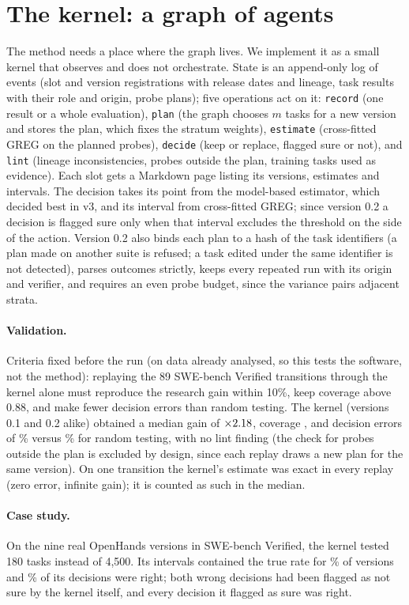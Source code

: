 \documentclass[11pt]{article}
\begin{document}
\section{The kernel: a graph of agents}
\label{sec:kernel}
The method needs a place where the graph lives. We implement it as a small kernel that observes and does not
orchestrate. State is an append-only log of events (slot and version registrations with release dates and lineage,
task results with their role and origin, probe plans); five operations act on it: \texttt{record} (one result or a
whole evaluation), \texttt{plan} (the graph chooses $m$ tasks for a new version and stores the plan, which fixes the
stratum weights), \texttt{estimate} (cross-fitted GREG on the planned probes), \texttt{decide} (keep or replace,
flagged sure or not), and \texttt{lint} (lineage inconsistencies, probes outside the plan, training tasks used as
evidence). Each slot gets a Markdown page listing its versions, estimates and intervals. The decision takes its point
from the model-based estimator, which decided best in v3, and its interval from cross-fitted GREG; since version 0.2 a
decision is flagged sure only when that interval excludes the threshold on the side of the action. Version 0.2 also
binds each plan to a hash of the task identifiers (a plan made on another suite is refused; a task edited under the
same identifier is not detected), parses outcomes strictly, keeps
every repeated run with its origin and verifier, and requires an even probe budget, since the variance pairs adjacent
strata.

\paragraph{Validation.} Criteria fixed before the run (on data already analysed, so this tests the software, not the
method): replaying the 89 SWE-bench Verified transitions through the
kernel alone must reproduce the research gain within 10\%, keep coverage above 0.88, and make fewer decision errors
than random testing. The
kernel (versions 0.1 and 0.2 alike) obtained a median gain of $\times2.18$, coverage \KernelCov, and decision errors of \KernelDec\% versus
\KernelDecReset\% for random testing, with no lint finding (the check for probes outside the plan is excluded by
design, since each replay draws a new plan for the same version). On one transition the kernel's estimate was exact in
every replay (zero error, infinite gain); it is counted as such in the median.

\paragraph{Case study.} On the nine real OpenHands versions in SWE-bench Verified, the kernel tested 180 tasks instead
of 4{,}500. Its intervals contained the true rate for \DemoCov\% of versions and \DemoGood\% of its decisions were
right; both wrong decisions had been flagged as not sure by the kernel itself, and every decision it flagged as sure
was right.
\end{document}
